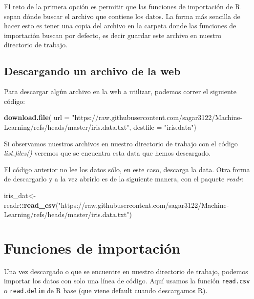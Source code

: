 \documentclass[
]{book}
\newenvironment{Shaded}{\begin{snugshade}}{\end{snugshade}}
\newcommand{\AttributeTok}[1]{\textcolor[rgb]{0.13,0.29,0.53}{#1}}
\newcommand{\FunctionTok}[1]{\textcolor[rgb]{0.13,0.29,0.53}{\textbf{#1}}}
\newcommand{\NormalTok}[1]{#1}
\newcommand{\OtherTok}[1]{\textcolor[rgb]{0.56,0.35,0.01}{#1}}
\newcommand{\SpecialCharTok}[1]{\textcolor[rgb]{0.81,0.36,0.00}{\textbf{#1}}}
\newcommand{\StringTok}[1]{\textcolor[rgb]{0.31,0.60,0.02}{#1}}
\begin{document}
El reto de la primera opción es permitir que las funciones de importación de R sepan dónde buscar el archivo que contiene los datos.
La forma más sencilla de hacer esto es tener una copia del archivo en la carpeta donde las funciones de importación buscan por defecto, es decir guardar este archivo en nuestro directorio de trabajo.

\subsection{Descargando un archivo de la web}\label{descargando-un-archivo-de-la-web}

Para descargar algún archivo en la web a utilizar, podemos correr el siguiente código:

\begin{Shaded}
\begin{Highlighting}[]
\FunctionTok{download.file}\NormalTok{(}
  \AttributeTok{url =} \StringTok{"https://raw.githubusercontent.com/sagar3122/Machine{-}Learning/refs/heads/master/iris.data.txt"}\NormalTok{, }
  \AttributeTok{destfile =} \StringTok{"iris.data"}\NormalTok{)}
\end{Highlighting}
\end{Shaded}

Si observamos nuestros archivos en nuestro directorio de trabajo con el código \emph{list.files()} veremos que se encuentra esta data que hemos descargado.

El código anterior no lee los datos sólo, en este caso, descarga la data.
Otra forma de descargarlo y a la vez abrirlo es de la siguiente manera, con el paquete \emph{readr}:

\begin{Shaded}
\begin{Highlighting}[]
\NormalTok{iris\_dat}\OtherTok{\textless{}{-}}\NormalTok{readr}\SpecialCharTok{::}\FunctionTok{read\_csv}\NormalTok{(}\StringTok{"https://raw.githubusercontent.com/sagar3122/Machine{-}Learning/refs/heads/master/iris.data.txt"}\NormalTok{)}
\end{Highlighting}
\end{Shaded}

\section{Funciones de importación}\label{funciones-de-importaciuxf3n}

Una vez descargado o que se encuentre en nuestro directorio de trabajo, podemos importar los datos con solo una línea de código.
Aquí usamos la función \texttt{read.csv} o \texttt{read.delim} de R base (que viene default cuando descargamos R).
\end{document}

